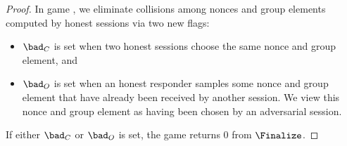 \begin{proof}
	
	In game \thisGameMath[\advA^*], we eliminate collisions among nonces and group elements computed by honest sessions via two new flags:
	\begin{itemize}
		\item $\bad_C$ is set when two honest sessions choose the same nonce and group element, and
		\item $\bad_O$ is set when an honest responder samples some nonce and group element that have already been received by another session. 
		We view this nonce and group element as having been chosen by an adversarial session.
	\end{itemize}
	If either $\bad_C$ or $\bad_O$ is set, the game returns $0$ from $\Finalize$.
	

\end{proof}
